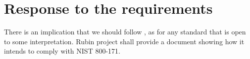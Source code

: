 \section{Response to the requirements}\label{sec:resp}

There is an implication that we should follow , as for any standard that is open to some interpretation.
\reqsimp
{
Rubin project shall provide a document  showing how it intends to comply with NIST 800-171.
}








